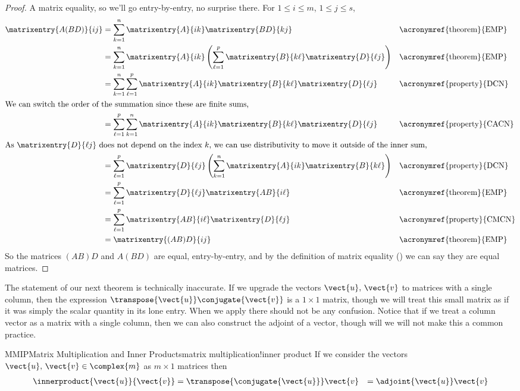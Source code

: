 \begin{proof}
A matrix equality, so we'll go entry-by-entry, no surprise there.    For $1\leq i\leq m$, $1\leq j\leq s$,
%
\begin{align*}
\matrixentry{A(BD)}{ij}
&=\sum_{k=1}^{n}\matrixentry{A}{ik}\matrixentry{BD}{kj}
&&\text{\acronymref{theorem}{EMP}}\\
&=\sum_{k=1}^{n}\matrixentry{A}{ik}\left(\sum_{\ell=1}^{p}\matrixentry{B}{k\ell}\matrixentry{D}{\ell j}\right)
&&\text{\acronymref{theorem}{EMP}}\\
&=\sum_{k=1}^{n}\sum_{\ell=1}^{p}\matrixentry{A}{ik}\matrixentry{B}{k\ell}\matrixentry{D}{\ell j}
&&\text{\acronymref{property}{DCN}}\\
%
\intertext{We can switch the order of the summation since these are finite sums,}
%
&=\sum_{\ell=1}^{p}\sum_{k=1}^{n}\matrixentry{A}{ik}\matrixentry{B}{k\ell}\matrixentry{D}{\ell j}
&&\text{\acronymref{property}{CACN}}\\
%
\intertext{As $\matrixentry{D}{\ell j}$ does not depend on the index $k$, we can use distributivity to move it outside of the inner sum,}
%
&=\sum_{\ell=1}^{p}\matrixentry{D}{\ell j}\left(\sum_{k=1}^{n}\matrixentry{A}{ik}\matrixentry{B}{k\ell}\right)
&&\text{\acronymref{property}{DCN}}\\
&=\sum_{\ell=1}^{p}\matrixentry{D}{\ell j}\matrixentry{AB}{i\ell}
&&\text{\acronymref{theorem}{EMP}}\\
&=\sum_{\ell=1}^{p}\matrixentry{AB}{i\ell}\matrixentry{D}{\ell j}
&&\text{\acronymref{property}{CMCN}}\\
&=\matrixentry{(AB)D}{ij}&&\text{\acronymref{theorem}{EMP}}
\end{align*}
%
So the matrices $(AB)D$ and $A(BD)$ are equal, entry-by-entry, and by the definition of matrix equality () we can say they are equal matrices.
%
\end{proof}
%
The statement of our next theorem is technically inaccurate.  If we upgrade the vectors $\vect{u},\,\vect{v}$ to matrices with a single column, then the expression $\transpose{\vect{u}}\conjugate{\vect{v}}$ is a $1\times 1$ matrix, though we will treat this small matrix as if it was simply the scalar quantity in its lone entry.  When we apply  there should not be any confusion.  Notice that if we treat a column vector as a matrix with a single column, then we can also construct the adjoint of a vector, though will we will not make this a common practice.
%
\begin{theorem}{MMIP}{Matrix Multiplication and Inner Products}{matrix multiplication!inner product}
If we consider the vectors $\vect{u},\,\vect{v}\in\complex{m}$ as $m\times 1$ matrices then
%
\begin{align*}
\innerproduct{\vect{u}}{\vect{v}}
&=\transpose{\conjugate{\vect{u}}}\vect{v}
&=\adjoint{\vect{u}}\vect{v}
\end{align*}
%
\end{theorem}
